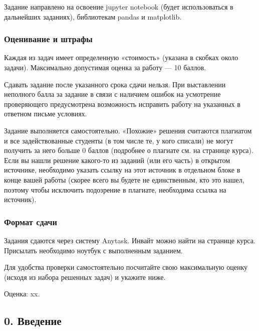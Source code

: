 \documentclass[11pt]{article}
\begin{document}
Задание направлено на освоение jupyter notebook (будет использоваться в
дальнейших заданиях), библиотекам pandas и matplotlib.

\hypertarget{ux43eux446ux435ux43dux438ux432ux430ux43dux438ux435-ux438-ux448ux442ux440ux430ux444ux44b}{%
\subsubsection{Оценивание и
штрафы}\label{ux43eux446ux435ux43dux438ux432ux430ux43dux438ux435-ux438-ux448ux442ux440ux430ux444ux44b}}

Каждая из задач имеет определенную «стоимость» (указана в скобках около
задачи). Максимально допустимая оценка за работу --- 10 баллов.

Сдавать задание после указанного срока сдачи нельзя. При выставлении
неполного балла за задание в связи с наличием ошибок на усмотрение
проверяющего предусмотрена возможность исправить работу на указанных в
ответном письме условиях.

Задание выполняется самостоятельно. «Похожие» решения считаются
плагиатом и все задействованные студенты (в том числе те, у кого
списали) не могут получить за него больше 0 баллов (подробнее о плагиате
см. на странице курса). Если вы нашли решение какого-то из заданий (или
его часть) в открытом источнике, необходимо указать ссылку на этот
источник в отдельном блоке в конце вашей работы (скорее всего вы будете
не единственным, кто это нашел, поэтому чтобы исключить подозрение в
плагиате, необходима ссылка на источник).

\hypertarget{ux444ux43eux440ux43cux430ux442-ux441ux434ux430ux447ux438}{%
\subsubsection{Формат
сдачи}\label{ux444ux43eux440ux43cux430ux442-ux441ux434ux430ux447ux438}}

Задания сдаются через систему Anytask. Инвайт можно найти на странице
курса. Присылать необходимо ноутбук с выполненным заданием.

Для удобства проверки самостоятельно посчитайте свою максимальную оценку
(исходя из набора решенных задач) и укажите ниже.

Оценка: xx.

    \hypertarget{ux432ux432ux435ux434ux435ux43dux438ux435}{%
\subsection{0.
Введение}\label{ux432ux432ux435ux434ux435ux43dux438ux435}}
\end{document}
